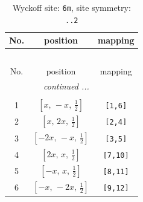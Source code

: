 \documentclass[fleqn,8pt]{jsarticle}
\begin{document}
\renewcommand{\arraystretch}{1.2}
\begin{longtable}{ccc}
\caption{Wyckoff site: {\tt 6m}, site symmetry: {\tt ..2}}
 \\
 \hline \hline
No. & position & mapping \\ \hline \endfirsthead

\multicolumn{2}{l}{\tablename\ \thetable{}} \\
 \hline \hline
No. & position & mapping \\ \hline \endhead

 \hline \hline
\multicolumn{2}{r}{\footnotesize\it continued ...} \\ \endfoot

 \hline \hline
\multicolumn{2}{r}{} \\ \endlastfoot

1 & $\left[ x,\, - x,\, \frac{1}{2} \right]$ & {\tt [1,6]} \\ \hline
2 & $\left[ x,\, 2 x,\, \frac{1}{2} \right]$ & {\tt [2,4]} \\ \hline
3 & $\left[ - 2 x,\, - x,\, \frac{1}{2} \right]$ & {\tt [3,5]} \\ \hline
4 & $\left[ 2 x,\, x,\, \frac{1}{2} \right]$ & {\tt [7,10]} \\ \hline
5 & $\left[ - x,\, x,\, \frac{1}{2} \right]$ & {\tt [8,11]} \\ \hline
6 & $\left[ - x,\, - 2 x,\, \frac{1}{2} \right]$ & {\tt [9,12]} \\
\end{longtable}
\renewcommand{\arraystretch}{1.2}
\end{document}

